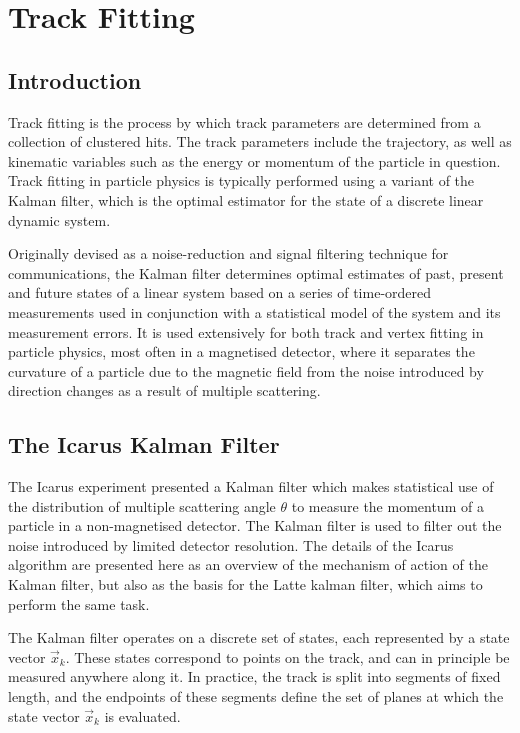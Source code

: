 \chapter{Track Fitting}

\section{Introduction}
Track fitting is the process by which track parameters are determined from a collection of clustered hits. The track parameters include the trajectory, as well as kinematic variables such as the energy or momentum of the particle in question. Track fitting in particle physics is typically performed using a variant of the Kalman filter, which is the optimal estimator for the state of a discrete linear dynamic system.

Originally devised as a noise-reduction and signal filtering technique for communications, the Kalman filter determines optimal estimates of past, present and future states of a linear system based on a series of time-ordered measurements used in conjunction with a statistical model of the system and its measurement errors. It is used extensively for both track and vertex fitting in particle physics, most often in a magnetised detector, where it separates the curvature of a particle due to the magnetic field from the noise introduced by direction changes as a result of multiple scattering.

\section{The Icarus Kalman Filter}
The Icarus\citep{Amerio2004} experiment presented a Kalman filter which makes statistical use of the distribution of multiple scattering angle $\theta$ to measure the momentum of a particle in a non-magnetised detector\citep{Ankowski2006}. The Kalman filter is used to filter out the noise introduced by limited detector resolution. The details of the Icarus algorithm are presented here as an overview of the mechanism of action of the Kalman filter, but also as the basis for the Latte kalman filter, which aims to perform the same task.

The Kalman filter operates on a discrete set of states, each represented by a state vector $\vec{x}_k$. These states correspond to points on the track, and can in principle be measured anywhere along it. In practice, the track is split into segments of fixed length, and the endpoints of these segments define the set of planes at which the state vector $\vec{x}_k$ is evaluated. 

